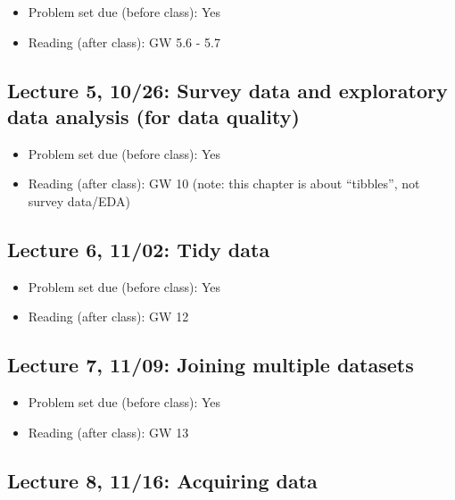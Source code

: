 \documentclass[11pt,]{article}
\providecommand{\tightlist}{%
  \setlength{\itemsep}{0pt}\setlength{\parskip}{0pt}}
\begin{document}
\begin{itemize}
\tightlist
\item
  Problem set due (before class): Yes
\item
  Reading (after class): GW 5.6 - 5.7
\end{itemize}

\subsection{Lecture 5, 10/26: Survey data and exploratory data analysis
(for data
quality)}\label{lecture-5-1026-survey-data-and-exploratory-data-analysis-for-data-quality}

\begin{itemize}
\tightlist
\item
  Problem set due (before class): Yes
\item
  Reading (after class): GW 10 (note: this chapter is about ``tibbles'',
  not survey data/EDA)
\end{itemize}

\subsection{Lecture 6, 11/02: Tidy data}\label{lecture-6-1102-tidy-data}

\begin{itemize}
\tightlist
\item
  Problem set due (before class): Yes
\item
  Reading (after class): GW 12
\end{itemize}

\subsection{Lecture 7, 11/09: Joining multiple
datasets}\label{lecture-7-1109-joining-multiple-datasets}

\begin{itemize}
\tightlist
\item
  Problem set due (before class): Yes
\item
  Reading (after class): GW 13
\end{itemize}

\subsection{Lecture 8, 11/16: Acquiring
data}\label{lecture-8-1116-acquiring-data}
\end{document}
